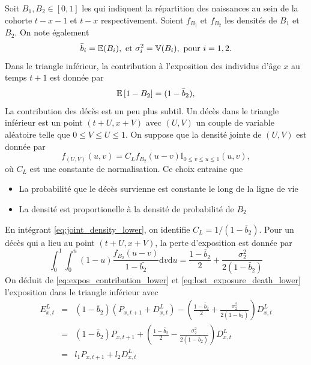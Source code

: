 Soit $B_1,B_2\in[0,1]$ les \va qui indiquent la répartition des naissances au sein de la cohorte $t-x-1$ et $t-x$ respectivement. Soient $f_{B_1}$ et $f_{B_2}$ les densités de $B_1$ et $B_2$. On note également 
$$
\bar{b}_i = \mathbb{E}(B_i),\text{ et }\sigma_i^2 = \mathbb{V}(B_i),\text{ pour }i = 1,2.
$$
Dans le triangle inférieur, la contribution à l'exposition des individus d'âge $x$ au temps $t+1$ est donnée par 
\begin{equation}\label{eq:expos_contribution_lower}
\mathbb{E}\left[1-B_2\right] = (1-\bar{b}_2), 
\end{equation}
La contribution des décès est un peu plus subtil. Un décès dans le triangle inférieur est un point $(t+U, x+V)$ avec $(U,V)$ un couple de variable aléatoire telle que $0\leq V\leq U\leq 1$. On suppose que la densité jointe de $(U,V)$ est donnée par 
\begin{equation}\label{eq:joint_density_lower}
f_{(U,V)}(u,v) = C_L f_{B_{2}}(u-v)\mathbb{I}_{0\leq v\leq u\leq 1}(u,v),
\end{equation}
où $C_L$ est une constante de normalisation. Ce choix entraine que 
\begin{itemize}
  \item La probabilité que le décès survienne est constante le long de la ligne de vie
  \item La densité est proportionelle à la densité de probabilité de $B_2$
\end{itemize}
En intégrant \eqref{eq:joint_density_lower}, on identifie $C_L = 1/(1-\bar{b}_{2})$. Pour un décès qui a lieu au point $(t+U, x+V)$, la perte d'exposition est donnée par 
\begin{equation}\label{eq:lost_exposure_death_lower}
\int_{0}^1\int_{0}^u(1-u)\frac{f_{B_2}(u-v)}{1 - \bar{b_2}}\text{d}v\text{d}u = \frac{1-\bar{b}_2}{2}+\frac{\sigma_2^2}{2(1-\bar{b}_2)}
\end{equation}
On déduit de \eqref{eq:expos_contribution_lower} et \eqref{eq:lost_exposure_death_lower} l'exposition dans le triangle inférieur avec 
\begin{eqnarray*}
E^L_{x,t}&=&(1-\bar{b}_2)(P_{x,t+1}+D^L_{x,t}) - \left(\frac{1-\bar{b}_2}{2}+\frac{\sigma_2^2}{2(1-\bar{b}_2)}\right)D^L_{x,t}\\
& =& (1-\bar{b}_2)P_{x,t+1} + \left(\frac{1-\bar{b}_2}{2}-\frac{\sigma_2^2}{2(1-\bar{b}_2)}\right)D^L_{x,t}\\
&=& l_1P_{x,t+1} + l_2 D^L_{x,t}
\end{eqnarray*}

